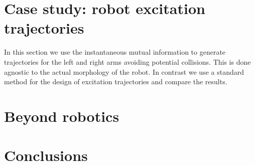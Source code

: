 \section{Case study: robot excitation trajectories}
\TODO
In this section we use the instantaneous mutual information to generate trajectories for the left and right arms avoiding potential collisions. This is done agnostic to the actual morphology of the robot. In contrast we use a standard method for the design of excitation trajectories and compare the results.

\section{Beyond robotics}
\TODO
{}

\section{Conclusions}\label{sec:conclusion}



\printbibliography 
